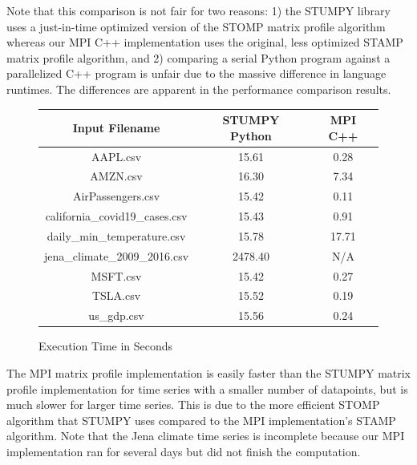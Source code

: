 \documentclass[conference]{IEEEtran}
\begin{document}
Note that this comparison is not fair for two reasons:  1) the STUMPY library uses a just-in-time optimized version of the STOMP matrix profile algorithm\cite{Stumpy} whereas our MPI C++ implementation uses the original, less optimized STAMP matrix profile algorithm\cite{MatrixProfile1}, and 2) comparing a serial Python program against a parallelized C++ program is unfair due to the massive difference in language runtimes.  The differences are apparent in the performance comparison results. 

\begin{figure}
\caption{Execution Time in Seconds}
\begin{tabular}{|c|c|c|}
\hline
\textbf{Input Filename} & \textbf{STUMPY Python} & \textbf{MPI C++} \\ \hline \hline
AAPL.csv & 15.61 & 0.28 \\ \hline
AMZN.csv & 16.30 & 7.34 \\ \hline
AirPassengers.csv & 15.42 & 0.11 \\ \hline
california\_covid19\_cases.csv & 15.43 & 0.91 \\ \hline
daily\_min\_temperature.csv & 15.78 & 17.71 \\ \hline
jena\_climate\_2009\_2016.csv & 2478.40 & N/A \\ \hline
MSFT.csv & 15.42 & 0.27 \\ \hline
TSLA.csv & 15.52 & 0.19 \\ \hline
us\_gdp.csv & 15.56 & 0.24 \\ \hline \hline
\end{tabular}
\label{fig:Execution_Time}
\end{figure}

The MPI matrix profile implementation is easily faster than the STUMPY matrix profile implementation for time series with a smaller number of datapoints, but is much slower for larger time series.  This is due to the more efficient STOMP algorithm that STUMPY uses compared to the MPI implementation's STAMP algorithm.  Note that the Jena climate time series is incomplete because our MPI implementation ran for several days but did not finish the computation.
\end{document}
